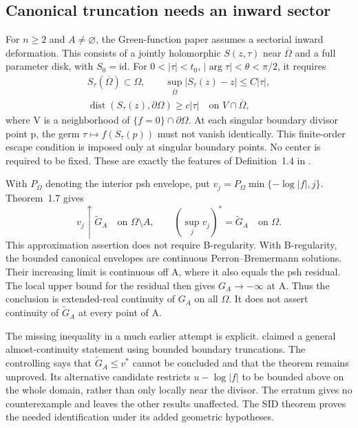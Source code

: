 \subsection{Canonical truncation needs an inward sector}
\label{sec:appH-boundary-SID}

For \(n\geq2\) and \(A\ne\varnothing\), the Green-function paper
assumes a sectorial inward deformation. This consists of a jointly
holomorphic \(S(z,\tau)\) near \(\overline\Omega\) and a full
parameter disk, with \(S_0=\mathrm{id}\). For
\(0<|\tau|<t_0\), \(|\arg\tau|<\theta<\pi/2\), it requires
\[
 \begin{gathered}
 S_\tau(\overline\Omega)\subset\Omega,\qquad
 \sup_{\overline\Omega}|S_\tau(z)-z|\leq C|\tau|,\\
 \operatorname{dist}(S_\tau(z),\partial\Omega)\geq c|\tau|
 \quad\text{on }V\cap\overline\Omega,
 \end{gathered}
 \tag{H.19}\label{eq:appH-boundary-SID}
\]
where V is a neighborhood of \(\{f=0\}\cap\partial\Omega\).
At each singular boundary divisor point p, the germ
\(\tau\mapsto f(S_\tau(p))\) must not vanish identically.
This finite-order escape condition is imposed only at singular
boundary points. No center is required to be fixed.
These are exactly the features of Definition~1.4 in
\cite[actual pp.~4--5]{DaoNguyenTran26HypersurfaceGreenV1}.

With \(P_\Omega\) denoting the interior psh envelope, put
\(v_j=P_\Omega\min\{-\log|f|,j\}\). Theorem~1.7 gives
\[
 v_j\uparrow\widetilde G_A\quad\text{on }\Omega\setminus A,
 \qquad\left(\sup_jv_j\right)^*=\widetilde G_A
                              \quad\text{on }\Omega.
 \tag{H.20}\label{eq:appH-boundary-canonical-truncation}
\]
This approximation assertion does not require B-regularity.
With B-regularity, the bounded canonical envelopes are continuous
Perron--Bremermann solutions. Their increasing limit is continuous
off A, where it also equals the psh residual. The local upper bound
for the residual then gives \(G_A\to-\infty\) at A. Thus the
conclusion is extended-real continuity of \(G_A\) on all
\(\Omega\). It does not assert continuity of \(\widetilde G_A\)
at every point of A.

The missing inequality in a much earlier attempt is explicit.
\cite[Theorem~3.9, printed~1532--1533]{LarussonSigurdsson99GreenPublished}
claimed a general almost-continuity statement using bounded boundary
truncations. The controlling \cite[printed~1705]{LarussonSigurdsson01GreenErratum}
says that \(\widetilde G_A\leq v^*\) cannot be concluded and that
the theorem remains unproved. Its alternative candidate restricts
\(u-\log|f|\) to be bounded above on the whole domain, rather than
only locally near the divisor. The erratum gives no counterexample
and leaves the other results unaffected. The SID theorem proves the
needed identification under its added geometric hypotheses.

